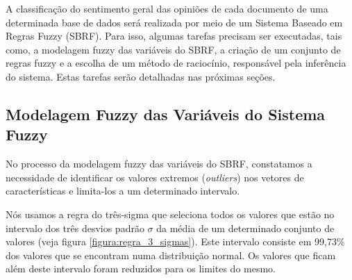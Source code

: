 
A classificação do sentimento geral das opiniões de cada documento de uma determinada base de dados será realizada por meio de um Sistema Baseado em Regras Fuzzy (SBRF). Para isso, algumas tarefas precisam ser executadas, tais como, a modelagem fuzzy das variáveis do SBRF, a criação de um conjunto de regras fuzzy e a escolha de um método de raciocínio, responsável pela inferência do sistema. Estas tarefas serão detalhadas nas próximas seções.

\subsection{Modelagem Fuzzy das Variáveis do Sistema Fuzzy}

No processo da modelagem fuzzy das variáveis do SBRF, constatamos a necessidade de identificar os valores extremos (\textit{outliers}) nos vetores de características e limita-los a um determinado intervalo. 

Nós usamos a regra do três-sigma \cite{kazmier2004schaum} que seleciona todos os valores que estão no intervalo dos três desvios padrão $\sigma$ da média de um determinado conjunto de valores (veja figura \ref{figura:regra_3_sigmas}). Este intervalo consiste em 99,73\% dos valores que se encontram numa distribuição normal. Os valores que ficam além deste intervalo foram reduzidos para os limites do mesmo.

